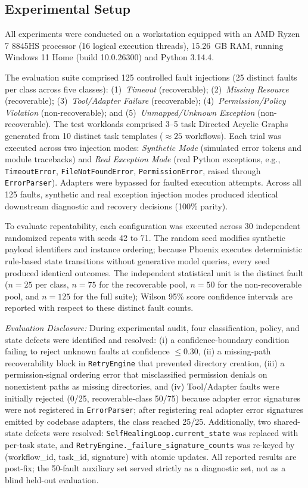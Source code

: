 \documentclass[conference]{IEEEtran}
\begin{document}
\subsection{Experimental Setup}
All experiments were conducted on a workstation equipped with an AMD Ryzen 7 8845HS processor (16 logical execution threads), 15.26~GB RAM, running Windows 11 Home (build 10.0.26300) and Python 3.14.4. 

The evaluation suite comprised 125 controlled fault injections (25 distinct faults per class across five classes): (1)~\textit{Timeout} (recoverable); (2)~\textit{Missing Resource} (recoverable); (3)~\textit{Tool/Adapter Failure} (recoverable); (4)~\textit{Permission/Policy Violation} (non-recoverable); and (5)~\textit{Unmapped/Unknown Exception} (non-recoverable). The test workloads comprised 3--5 task Directed Acyclic Graphs generated from 10 distinct task templates ($\approx 25$ workflows). Each trial was executed across two injection modes: \textit{Synthetic Mode} (simulated error tokens and module tracebacks) and \textit{Real Exception Mode} (real Python exceptions, e.g., \texttt{TimeoutError}, \texttt{FileNotFoundError}, \texttt{PermissionError}, raised through \texttt{ErrorParser}). Adapters were bypassed for faulted execution attempts. Across all 125 faults, synthetic and real exception injection modes produced identical downstream diagnostic and recovery decisions (100\% parity).

To evaluate repeatability, each configuration was executed across 30 independent randomized repeats with seeds 42 to 71. The random seed modifies synthetic payload identifiers and instance ordering; because Phoenix executes deterministic rule-based state transitions without generative model queries, every seed produced identical outcomes. The independent statistical unit is the distinct fault ($n=25$ per class, $n=75$ for the recoverable pool, $n=50$ for the non-recoverable pool, and $n=125$ for the full suite); Wilson 95\% score confidence intervals are reported with respect to these distinct fault counts.

\textit{Evaluation Disclosure:} During experimental audit, four classification, policy, and state defects were identified and resolved: (i) a confidence-boundary condition failing to reject unknown faults at confidence $\le 0.30$, (ii) a missing-path recoverability block in \texttt{RetryEngine} that prevented directory creation, (iii) a permission-signal ordering error that misclassified permission denials on nonexistent paths as missing directories, and (iv) Tool/Adapter faults were initially rejected (0/25, recoverable-class 50/75) because adapter error signatures were not registered in \texttt{ErrorParser}; after registering real adapter error signatures emitted by codebase adapters, the class reached 25/25. Additionally, two shared-state defects were resolved: \texttt{SelfHealingLoop.current\_state} was replaced with per-task state, and \texttt{RetryEngine.\_failure\_signature\_counts} was re-keyed by (workflow\_id, task\_id, signature) with atomic updates. All reported results are post-fix; the 50-fault auxiliary set served strictly as a diagnostic set, not as a blind held-out evaluation.
\end{document}

